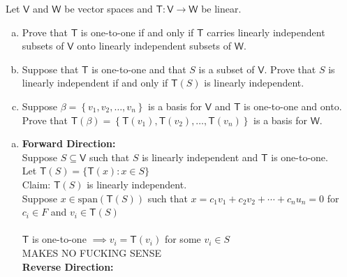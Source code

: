Let $\mathsf{V}$ and $\mathsf{W}$ be vector spaces and
$\mathsf{T}\colon\mathsf{V} \to \mathsf{W}$ be linear.
\begin{enumerate}[(a)]
\item Prove that $\mathsf{T}$ is one-to-one if and only if
  $\mathsf{T}$ carries linearly independent subsets of $\mathsf{V}$
  onto linearly independent subsets of $\mathsf{W}$.
\item Suppose that $\mathsf{T}$ is one-to-one and that $S$ is a subset
  of $\mathsf{V}$. Prove that $S$ is linearly independent if and only
  if $\mathsf{T}(S)$ is linearly independent.
\item Suppose $\beta = \left\{v_1,v_2,\dots,v_n\right\}$ is a basis
  for $\mathsf{V}$ and $\mathsf{T}$ is one-to-one and onto. Prove that
  $\mathsf{T}(\beta) =
  \left\{\mathsf{T}(v_1),\mathsf{T}(v_2),\dots,\mathsf{T}(v_n)\right\}$
  is a basis for $\mathsf{W}$.
\end{enumerate}
\begin{enumerate}[(a)]
\item 
\textbf{Forward Direction:}
\\Suppose $S \subseteq \mathsf{V}$ such that  $S$ is linearly independent and
$\mathsf{T}$ is one-to-one.\\ Let $\mathsf{T}(S) = \{\mathsf{T}(x)
\colon x \in S\}$
\\Claim: $\mathsf{T}(S)$ is linearly independent.
\\Suppose $x \in \text{span}(\mathsf{T}(S))$ such that $ x = c_1v_1
+c_2v_2 + \cdots + c_nu_n =0$ for $c_i \in F$ and $v_i \in
\mathsf{T}(S)$
\paragraph{}
$\mathsf{T}$ is one-to-one $\implies v_i =\mathsf{T}(v_i)$ for some
$v_i \in S$\\
{\huge MAKES NO FUCKING SENSE}
\\\textbf{Reverse Direction:}
\end{enumerate}
